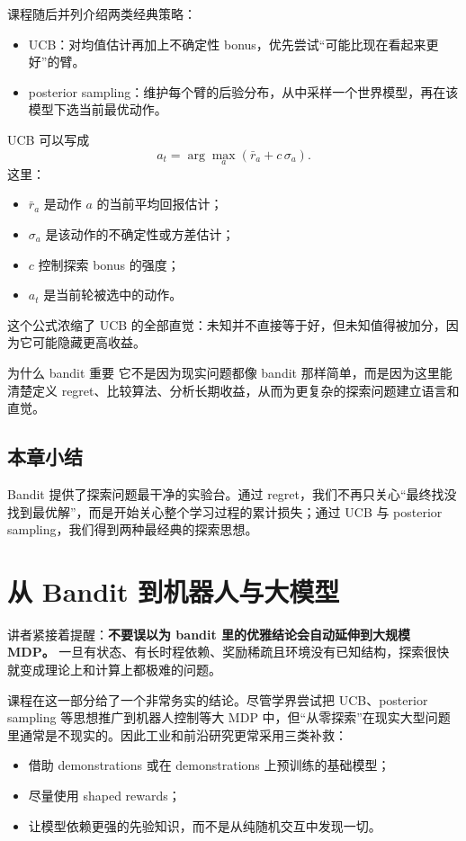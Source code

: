 \documentclass[a4paper]{article}
\begin{document}
课程随后并列介绍两类经典策略：
\begin{itemize}
\item UCB：对均值估计再加上不确定性 bonus，优先尝试“可能比现在看起来更好”的臂。
\item posterior sampling：维护每个臂的后验分布，从中采样一个世界模型，再在该模型下选当前最优动作。
\end{itemize}

UCB 可以写成
\[
a_t=\arg\max_{a}\left(\bar{r}_a + c\,\sigma_a\right).
\]
这里：
\begin{itemize}
\item $\bar{r}_a$ 是动作 $a$ 的当前平均回报估计；
\item $\sigma_a$ 是该动作的不确定性或方差估计；
\item $c$ 控制探索 bonus 的强度；
\item $a_t$ 是当前轮被选中的动作。
\end{itemize}

这个公式浓缩了 UCB 的全部直觉：未知并不直接等于好，但未知值得被加分，因为它可能隐藏更高收益。

\begin{knowledgebox}{为什么 bandit 重要}
它不是因为现实问题都像 bandit 那样简单，而是因为这里能清楚定义 regret、比较算法、分析长期收益，从而为更复杂的探索问题建立语言和直觉。
\end{knowledgebox}

\subsection{本章小结}
Bandit 提供了探索问题最干净的实验台。通过 regret，我们不再只关心“最终找没找到最优解”，而是开始关心整个学习过程的累计损失；通过 UCB 与 posterior sampling，我们得到两种最经典的探索思想。

\section{从 Bandit 到机器人与大模型}
讲者紧接着提醒：\textbf{不要误以为 bandit 里的优雅结论会自动延伸到大规模 MDP。} 一旦有状态、有长时程依赖、奖励稀疏且环境没有已知结构，探索很快就变成理论上和计算上都极难的问题。

课程在这一部分给了一个非常务实的结论。尽管学界尝试把 UCB、posterior sampling 等思想推广到机器人控制等大 MDP 中，但“从零探索”在现实大型问题里通常是不现实的。因此工业和前沿研究更常采用三类补救：
\begin{itemize}
\item 借助 demonstrations 或在 demonstrations 上预训练的基础模型；
\item 尽量使用 shaped rewards；
\item 让模型依赖更强的先验知识，而不是从纯随机交互中发现一切。
\end{itemize}
\end{document}
